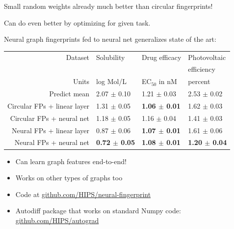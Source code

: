 \documentclass[landscape,a0b,final,a4resizeable]{include/a0poster}
\begin{document}
\begin{poster}
\begin{multicols}{3}
\vspace{0.5em}

Small random weights already much better than circular fingerprints!

Can do even better by optimizing for given task.

\vspace{1in}


Neural graph fingerprints fed to neural net generalizes state of the art:%

\vspace{0.5em}

\begin{center}
\begin{tabular}{r|lll}
Dataset                      &   Solubility  & Drug efficacy & Photovoltaic \\
 & & & efficiency \\
\midrule
Units                        &   log Mol/L                            & EC$_{50}$ in nM                        & percent \\
\midrule
Predict mean                 & 2.07 $\pm$ 0.10        & 1.21 $\pm$ 0.03         & 2.53 $\pm$ 0.02 \\
Circular FPs + linear layer  & 1.31 $\pm$ 0.05        & \bf{1.06} $\pm$ 0.01    & 1.62 $\pm$ 0.03 \\
Circular FPs + neural net    & 1.18 $\pm$ 0.05        & 1.16 $\pm$ 0.04         & 1.41 $\pm$ 0.03 \\ 
Neural FPs + linear layer    & 0.87 $\pm$ 0.06        & \bf{1.07} $\pm$ 0.01    & 1.61 $\pm$ 0.06 \\  
Neural FPs + neural net      & \bf{0.72} $\pm$ 0.05   & \bf{1.08} $\pm$ 0.01    & \bf{1.20} $\pm$ 0.04
\end{tabular}

\vspace{0.5em}


\end{center}

\vspace{0.5em}


\begin{itemize}
\item Can learn graph features end-to-end!
\item Works on other types of graphs too 
\item Code at \url{github.com/HIPS/neural-fingerprint}
\item Autodiff package that works on standard Numpy code:\\ \url{github.com/HIPS/autograd}
\end{itemize}



\end{multicols}
\end{poster}
\end{document}
